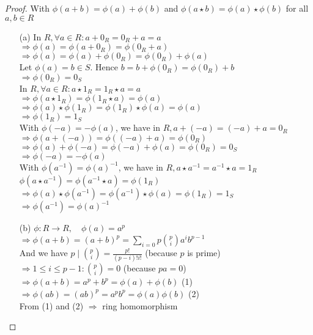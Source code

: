 \begin{proof}
With $\phi(a+b)=\phi(a)+\phi(b)$ and $\phi(a \star b) = \phi(a) \star \phi(b)$ for all $a, b \in R$

\begin{enumerate}
    \item [(a)] In $R, \forall a \in R: a+0_R=0_R+a=a$ \\ $\Rightarrow \phi(a)=\phi(a+0_R)=\phi(0_R+a)$ \\ $\Rightarrow \phi(a)=\phi(a)+\phi(0_R)=\phi(0_R)+\phi(a)$ \\ Let $\phi(a)=b \in S$. Hence $b=b+\phi(0_R)=\phi(0_R)+b$ \\ $\Rightarrow \phi(0_R)=0_S$ \\ In $R, \forall a \in R: a \star 1_R = 1_R \star a = a$ \\ $\Rightarrow \phi(a \star 1_R) = \phi(1_R \star a) = \phi(a)$ \\ $\Rightarrow \phi(a) \star \phi(1_R) = \phi(1_R) \star \phi(a) = \phi(a)$ \\ $\Rightarrow \phi(1_R) = 1_S$ \\ With $\phi(-a) = -\phi(a)$, we have in $R, a + (-a) = (-a) + a = 0_R$ \\ $\Rightarrow \phi(a+(-a))=\phi((-a)+a)=\phi(0_R)$ \\ $\Rightarrow \phi(a)+\phi(-a)=\phi(-a)+\phi(a)=\phi(0_R)=0_S$ \\ $\Rightarrow \phi(-a) = -\phi(a)$ \\ With $\phi(a^{-1}) = \phi(a)^{-1}$, we have in $R, a \star a^{-1} = a^{-1} \star a = 1_R$ \\ $\phi(a \star a^{-1}) = \phi(a^{-1} \star a) = \phi(1_R)$ \\ $\Rightarrow \phi(a) \star \phi(a^{-1}) = \phi(a^{-1}) \star \phi(a) = \phi(1_R) = 1_S$ \\ $\Rightarrow \phi(a^{-1})=\phi(a)^{-1}$
    \item [(b)] $\phi: R \rightarrow R, \quad \phi(a)=a^p$ \\ $\Rightarrow \phi(a+b)=(a+b)^p=\sum_{i=0}{p} \binom{p}{i} a^i b^{p-1}$ \\ And we have $p \mid \binom{p}{i} = \frac{p!}{(p-i)!i!}$ (because $p$ is prime) \\ $\Rightarrow 1 \leq i \leq p-1: \binom{p}{i} = 0$ (because $pa=0$) \\ $\Rightarrow \phi(a+b)=a^p+b^p=\phi(a)+\phi(b)$ (1) \\ $\Rightarrow \phi(ab)=(ab)^p=a^p b^p = \phi(a) \phi(b)$ (2) \\ From (1) and (2) $\Rightarrow$ ring homomorphism
\end{enumerate}
\end{proof}

